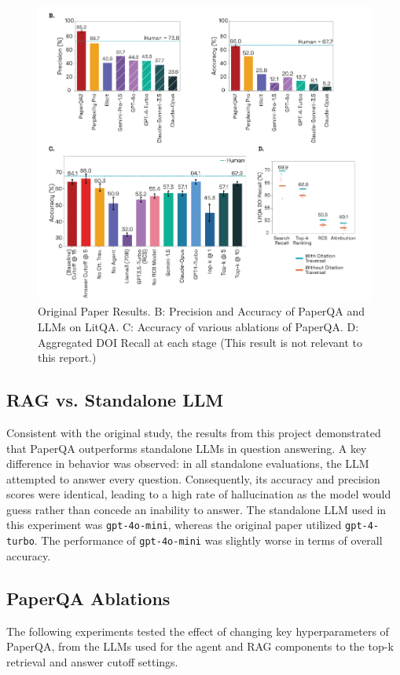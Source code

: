 \begin{figure}[H]
    \centering
    \includegraphics[width=\textwidth]{figures/original_result.png}
    \caption{Original Paper Results. B: Precision and Accuracy of PaperQA and LLMs on LitQA. C: Accuracy of various ablations of PaperQA. D: Aggregated DOI Recall at each stage (This result is not relevant to this report.)}
    \label{fig:original_result}
\end{figure}

\subsection{RAG vs. Standalone LLM}

Consistent with the original study, the results from this project demonstrated that PaperQA outperforms standalone LLMs in question answering. A key difference in behavior was observed: in all standalone evaluations, the LLM attempted to answer every question. Consequently, its accuracy and precision scores were identical, leading to a high rate of hallucination as the model would guess rather than concede an inability to answer. The standalone LLM used in this experiment was \texttt{gpt-4o-mini}, whereas the original paper utilized \texttt{gpt-4-turbo}. The performance of \texttt{gpt-4o-mini} was slightly worse in terms of overall accuracy. 

\subsection{PaperQA Ablations}
The following experiments tested the effect of changing key hyperparameters of PaperQA, from the LLMs used for the agent and RAG components to the top-k retrieval and answer cutoff settings. 


